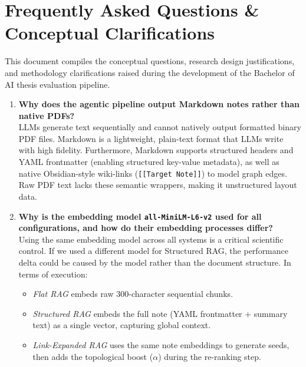 
\section*{Frequently Asked Questions \& Conceptual Clarifications}
\label{sec:research_decisions}

This document compiles the conceptual questions, research design justifications, and methodology clarifications raised during the development of the Bachelor of AI thesis evaluation pipeline.

\begin{enumerate}[label=\textbf{Q\arabic*:}, leftmargin=*]
    \item \textbf{Why does the agentic pipeline output Markdown notes rather than native PDFs?} \\
    LLMs generate text sequentially and cannot natively output formatted binary PDF files. Markdown is a lightweight, plain-text format that LLMs write with high fidelity. Furthermore, Markdown supports structured headers and YAML frontmatter (enabling structured key-value metadata), as well as native Obsidian-style wiki-links (\texttt{[[Target Note]]}) to model graph edges. Raw PDF text lacks these semantic wrappers, making it unstructured layout data.

    \item \textbf{Why is the embedding model \texttt{all-MiniLM-L6-v2} used for all configurations, and how do their embedding processes differ?} \\
    Using the same embedding model across all systems is a critical scientific control. If we used a different model for Structured RAG, the performance delta could be caused by the model rather than the document structure. 
    In terms of execution:
    \begin{itemize}
        \item \textit{Flat RAG} embeds raw 300-character sequential chunks.
        \item \textit{Structured RAG} embeds the full note (YAML frontmatter + summary text) as a single vector, capturing global context.
        \item \textit{Link-Expanded RAG} uses the same note embeddings to generate seeds, then adds the topological boost ($\alpha$) during the re-ranking step.
    \end{itemize}


\end{enumerate}
